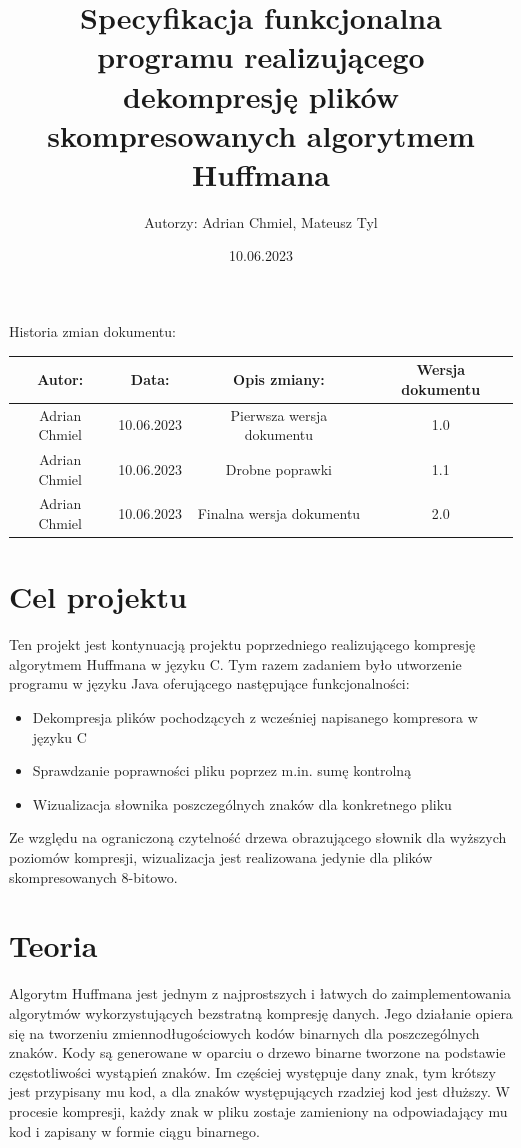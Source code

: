 \documentclass[]{article}
\title{Specyfikacja funkcjonalna programu realizującego dekompresję plików skompresowanych algorytmem Huffmana}
\author{Autorzy: Adrian Chmiel, Mateusz Tyl}
\date{10.06.2023}
\begin{document}
\maketitle
\begin{center}
Historia zmian dokumentu:\\
\end{center}

\begin{tabular}{|c|c|c|c|}
  \hline 
  Autor: & Data: & Opis zmiany:& Wersja dokumentu \\
  \hline
  Adrian Chmiel & 10.06.2023 & Pierwsza wersja dokumentu & 1.0 \\
  \hline
  Adrian Chmiel & 10.06.2023 & Drobne poprawki & 1.1 \\
  \hline
  Adrian Chmiel & 10.06.2023 & Finalna wersja dokumentu & 2.0 \\
  \hline
\end{tabular} 
\section{Cel projektu}\label{header-n231}

Ten projekt jest kontynuacją projektu poprzedniego realizującego kompresję algorytmem Huffmana w języku C. Tym razem zadaniem było utworzenie programu w języku Java oferującego następujące funkcjonalności:
\begin{itemize}
\item
Dekompresja plików pochodzących z wcześniej napisanego kompresora w języku C
\item
Sprawdzanie poprawności pliku poprzez m.in. sumę kontrolną
\item
Wizualizacja słownika poszczególnych znaków dla konkretnego pliku\end{itemize}
Ze względu na ograniczoną czytelność drzewa obrazującego słownik dla wyższych poziomów kompresji, wizualizacja jest realizowana jedynie dla plików skompresowanych 8-bitowo.
\section{Teoria}\label{header-n281}
Algorytm Huffmana jest jednym z najprostszych i łatwych do zaimplementowania algorytmów wykorzystujących bezstratną kompresję danych. Jego działanie opiera się na tworzeniu zmiennodługościowych kodów binarnych dla poszczególnych znaków. Kody są generowane w oparciu o drzewo binarne tworzone na podstawie częstotliwości wystąpień znaków. Im częściej występuje dany znak, tym krótszy jest przypisany mu kod, a dla znaków występujących rzadziej kod jest dłuższy. W procesie kompresji, każdy znak w pliku zostaje zamieniony na odpowiadający mu kod i zapisany w formie ciągu binarnego.\\
\end{document}
